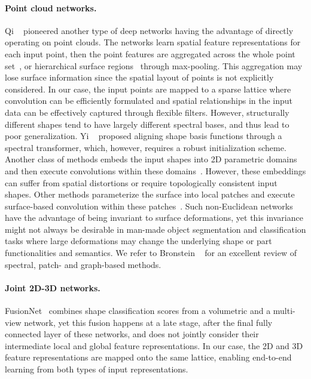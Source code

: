 \documentclass[10pt,twocolumn,letterpaper]{article}
\begin{document}
\vspace{-0.35cm}\paragraph{Point cloud networks.} Qi \etal~\cite{qi2017pointnet} pioneered another type of deep networks having the advantage of directly operating on point clouds. The networks learn spatial feature representations for each input point, then the point features are aggregated across the whole point set~\cite{qi2017pointnet}, or hierarchical surface regions~\cite{qi2017pointnetpp} through max-pooling. This aggregation may lose surface information since the spatial layout of points is not explicitly considered. In our case, the input points are mapped to a sparse lattice where convolution can be efficiently formulated and spatial relationships in the input data can be effectively captured through flexible filters. 
However, structurally different shapes tend to have largely different spectral bases, and thus lead to poor generalization. 
Yi \etal~\cite{yi2017syncspeccnn} proposed aligning shape basis functions through a spectral transformer, which, however, requires a robust initialization scheme.
 Another class of methods embeds the input shapes into 2D parametric domains and then execute convolutions within these domains~\cite{Sinha2016,Maron2017CNN,Ezuz2017}. However, these embeddings can suffer from spatial distortions or require topologically consistent input shapes. Other methods parameterize the surface into local patches and execute surface-based convolution within these patches~\cite{masci2015geodesic,Boscaini2016,Monti2017}. Such non-Euclidean networks have the advantage of being invariant to surface deformations, yet this invariance might not always be desirable in man-made object segmentation and classification tasks where large deformations may change the underlying shape or part functionalities and semantics. We refer to Bronstein \etal~\cite{bronstein2017geometric} for an excellent review of spectral, patch- and graph-based methods.

\vspace{-0.35cm}\paragraph{Joint 2D-3D networks.} FusionNet~\cite{hedge2016fusionnet} combines shape classification scores from a volumetric and a multi-view network, yet this fusion happens at a late stage, after the final fully connected layer of these networks, and does not jointly consider their intermediate local and global feature representations. In our case, the 2D and 3D feature representations are mapped onto the same lattice, enabling end-to-end learning from both types of input representations.
\end{document}
